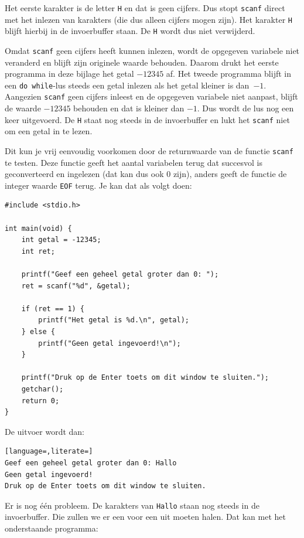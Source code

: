 \documentclass[a4paper,10pt,fleqn,twoside]{article}
\begin{document}
Het eerste karakter is de letter \lstinline|H| en dat is geen cijfers. Dus stopt \lstinline|scanf| direct met het inlezen van karakters (die dus alleen cijfers mogen zijn). Het karakter \lstinline|H| blijft hierbij in de invoerbuffer staan. De \lstinline|H| wordt dus niet verwijderd.

Omdat \lstinline|scanf| geen cijfers heeft kunnen inlezen, wordt de opgegeven variabele niet veranderd en blijft zijn originele waarde behouden. Daarom drukt het eerste programma in deze bijlage het getal $-12345$ af. Het tweede programma blijft in een \lstinline|do while|-lus steeds een getal inlezen als het getal kleiner is dan~$-1$. Aangezien \lstinline|scanf| geen cijfers inleest en de opgegeven variabele niet aanpast, blijft de waarde $-12345$ behouden en dat is kleiner dan $-1$. Dus wordt de lus nog een keer uitgevoerd. De \lstinline|H| staat nog steeds in de invoerbuffer en lukt het \lstinline|scanf| niet om een getal in te lezen.

Dit kun je vrij eenvoudig voorkomen door de returnwaarde van de functie \lstinline|scanf| te testen. Deze functie geeft het aantal variabelen terug dat succesvol is geconverteerd en ingelezen (dat kan dus ook 0 zijn), anders geeft de functie de integer waarde \lstinline|EOF| terug. Je kan dat als volgt doen:

\begin{lstlisting}
#include <stdio.h>

int main(void) {
    int getal = -12345;
    int ret;

    printf("Geef een geheel getal groter dan 0: ");
    ret = scanf("%d", &getal);

    if (ret == 1) {
        printf("Het getal is %d.\n", getal);
    } else {
        printf("Geen getal ingevoerd!\n");
    }

    printf("Druk op de Enter toets om dit window te sluiten.");
    getchar();
    return 0;
}
\end{lstlisting}

De uitvoer wordt dan:

\begin{lstlisting}[language=,literate=]
Geef een geheel getal groter dan 0: Hallo
Geen getal ingevoerd!
Druk op de Enter toets om dit window te sluiten.
\end{lstlisting}

Er is nog \'e\'en probleem. De karakters van \lstinline|Hallo| staan nog steeds in de invoerbuffer. Die zullen we er een voor een uit moeten halen. Dat kan met het onderstaande programma:
\end{document}

